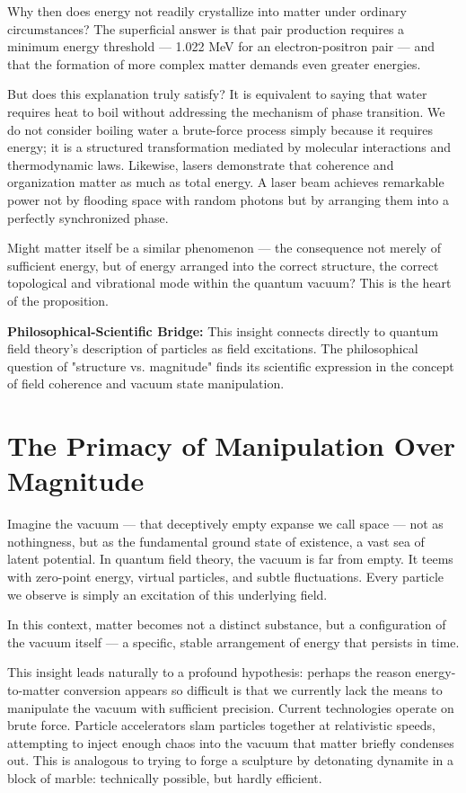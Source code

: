 \documentclass[12pt,a4paper]{article}
\begin{document}
Why then does energy not readily crystallize into matter under ordinary circumstances? The superficial answer is that pair production requires a minimum energy threshold — 1.022 MeV for an electron-positron pair — and that the formation of more complex matter demands even greater energies.

But does this explanation truly satisfy? It is equivalent to saying that water requires heat to boil without addressing the mechanism of phase transition. We do not consider boiling water a brute-force process simply because it requires energy; it is a structured transformation mediated by molecular interactions and thermodynamic laws. Likewise, lasers demonstrate that coherence and organization matter as much as total energy. A laser beam achieves remarkable power not by flooding space with random photons but by arranging them into a perfectly synchronized phase.

Might matter itself be a similar phenomenon — the consequence not merely of sufficient energy, but of energy arranged into the correct structure, the correct topological and vibrational mode within the quantum vacuum? This is the heart of the proposition.

\begin{bridgebox}
\textbf{Philosophical-Scientific Bridge:} This insight connects directly to quantum field theory's description of particles as field excitations. The philosophical question of "structure vs. magnitude" finds its scientific expression in the concept of field coherence and vacuum state manipulation.
\end{bridgebox}

\section{The Primacy of Manipulation Over Magnitude}

Imagine the vacuum — that deceptively empty expanse we call space — not as nothingness, but as the fundamental ground state of existence, a vast sea of latent potential. In quantum field theory, the vacuum is far from empty. It teems with zero-point energy, virtual particles, and subtle fluctuations. Every particle we observe is simply an excitation of this underlying field.

In this context, matter becomes not a distinct substance, but a configuration of the vacuum itself — a specific, stable arrangement of energy that persists in time.

This insight leads naturally to a profound hypothesis: perhaps the reason energy-to-matter conversion appears so difficult is that we currently lack the means to manipulate the vacuum with sufficient precision. Current technologies operate on brute force. Particle accelerators slam particles together at relativistic speeds, attempting to inject enough chaos into the vacuum that matter briefly condenses out. This is analogous to trying to forge a sculpture by detonating dynamite in a block of marble: technically possible, but hardly efficient.
\end{document}
